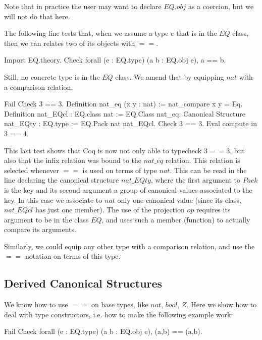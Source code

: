 Note that in practice the user may want to declare $EQ.obj$ as a coercion,
but we will not do that here.

The following line tests that, when we assume a type $e$ that is in the
$EQ$ class, then we can relates two of its objects with $==$.

\begin{coq_example}
Import EQ.theory.
Check forall (e : EQ.type) (a b : EQ.obj e), a == b.
\end{coq_example}

Still, no concrete type is in the $EQ$ class.  We amend that by equipping $nat$
with a comparison relation.

\begin{coq_example}
Fail Check 3 == 3.
Definition nat_eq (x y : nat) := nat_compare x y = Eq.
Definition nat_EQcl : EQ.class nat := EQ.Class nat_eq.
Canonical Structure nat_EQty : EQ.type := EQ.Pack nat nat_EQcl.
Check 3 == 3.
Eval compute in 3 == 4.
\end{coq_example}

This last test shows that Coq is now not only able to typecheck $3==3$, but
also that the infix relation was bound to the $nat\_eq$ relation.  This
relation is selected whenever $==$ is used on terms of type $nat$.  This
can be read in the line declaring the canonical structure $nat\_EQty$,
where the first argument to $Pack$ is the key and its second argument
a group of canonical values associated to the key.  In this case we associate
to $nat$ only one canonical value (since its class, $nat\_EQcl$ has just one
member).  The use of the projection $op$ requires its argument to be in
the class $EQ$, and uses such a member (function) to actually compare
its arguments.

Similarly, we could equip any other type with a comparison relation, and
use the $==$ notation on terms of this type.

\subsection{Derived Canonical Structures}

We know how to use $==$ on base types, like $nat$, $bool$, $Z$.
Here we show how to deal with type constructors, i.e. how to make the
following example work:

\begin{coq_example}
Fail Check forall (e : EQ.type) (a b : EQ.obj e), (a,b) == (a,b). 
\end{coq_example}

